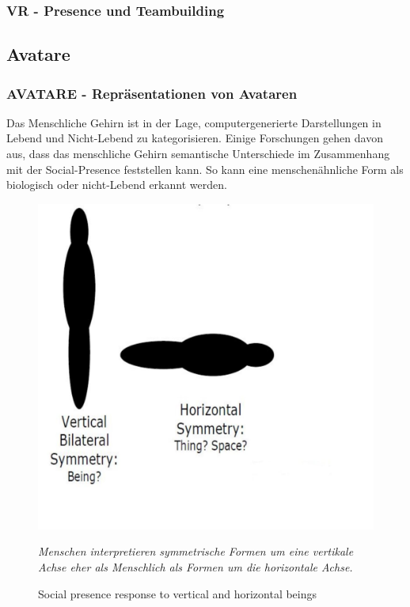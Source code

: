 \documentclass[a4paper,11pt]{article}%
\renewcommand{\\}{\vspace*{0.5\baselineskip} \newline}
\begin{document}
		\subsubsection{VR - Presence und Teambuilding}

\newpage

\subsection{Avatare}
\label{Avatare}
\subsubsection{AVATARE - Repräsentationen von Avataren}

Das Menschliche Gehirn ist in der Lage, computergenerierte Darstellungen in \dq{}Lebend und Nicht-Lebend\dq{} zu kategorisieren. Einige Forschungen gehen davon aus, dass das menschliche Gehirn semantische Unterschiede im Zusammenhang mit der \dq{}Social-Presence\dq{} feststellen kann. So kann eine menschenähnliche Form als biologisch oder nicht-Lebend erkannt werden. 

	\begin{figure}[H]
		\begin{footnotesize}
		\centering
			\includegraphics[scale= 0.3]{Abbildungen/Symmetry.JPG}
			\caption[Abbildung 1]{Social presence response to vertical and
horizontal beings}
			\textit{Menschen interpretieren symmetrische Formen um eine vertikale Achse eher als \dq{}Menschlich\dq{} als Formen um die horizontale Achse. \citep{biocca2002defining} }
			\label{vertical_horizontal}
		\end{footnotesize}
	\end{figure}
\end{document}
